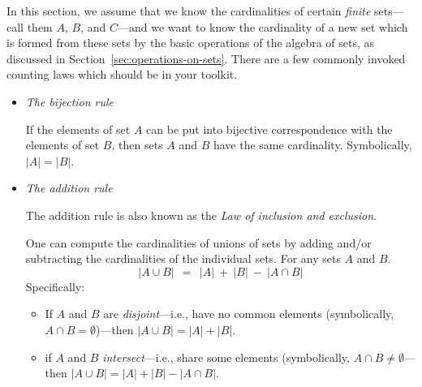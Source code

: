 In this section, we assume that we know the cardinalities of certain {\em finite} sets---call
them $A$, $B$, and $C$---and we want to know the cardinality of a new set which is formed
from these sets by the basic operations of the algebra of sets, as discussed in
Section~\ref{sec:operations-on-sets}.  There are a few commonly invoked counting laws
which should be in your toolkit.
\begin{itemize}
\item
{\it The bijection rule} 

\smallskip

If the elements of set $A$ can be put into bijective correspondence with the elements of set
$B$, then sets $A$ and $B$ have the same cardinality.  Symbolically, $|A| = |B|$.

\medskip\item
{\it The addition rule} 

The addition rule is also known as the {\it Law of inclusion and exclusion}.

\smallskip

One can compute the cardinalities of unions of sets by adding and/or subtracting
the cardinalities of the individual sets.  For any sets $A$ and $B$.
\[ |A \cup B| \ \ = \ \ |A|  \ + \ |B| \ - \ |A \cap B| \]
Specifically:
  \begin{itemize}
  \item
If $A$ and $B$ are {\em disjoint}---i.e., have no common elements (symbolically, $A \cap B = \emptyset$)---then $|A \cup B| = |A| + |B|$.

 \medskip\item
if $A$ and $B$ {\em intersect}---i.e., share some elements (symbolically, $A \cap B \neq \emptyset$---then $|A \cup B|  =  |A|  + |B| - |A \cap B|$.

\smallskip


\end{itemize}
\end{itemize}
